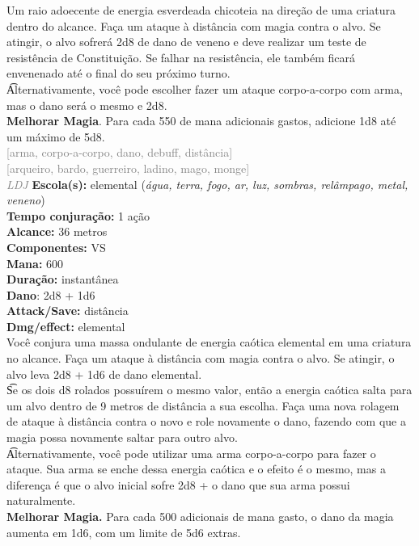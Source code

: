\documentclass{RPG_Adventure}[2021/10/20]
\begin{document}
{\normalsize Um raio adoecente de energia esverdeada chicoteia na direção de uma criatura dentro do alcance. Faça um ataque à distância com magia contra o alvo. Se atingir, o alvo sofrerá 2d8 de dano de veneno e deve realizar um teste de resistência de Constituição. Se falhar na resistência, ele também ficará envenenado até o final do seu próximo turno.\\\t Alternativamente, você pode escolher fazer um ataque corpo-a-corpo com arma, mas o dano será o mesmo e 2d8.\\\t \textbf{Melhorar Magia}. Para cada 550 de mana adicionais gastos, adicione 1d8 até um máximo de 5d8.\\}
{\scriptsize \textcolor{gray}{[arma, corpo-a-corpo, dano, debuff, distância]\\}}
{\scriptsize \textcolor{gray}{[arqueiro, bardo, guerreiro, ladino, mago, monge]\\}}
{\tiny \textcolor{gray}{\textit{LDJ}}}\jump{}
{\small \t \textbf{Escola(s):} elemental (\textit{água, terra, fogo, ar, luz, sombras, relâmpago, metal, veneno})\\\t \textbf{Tempo conjuração:} 1 ação\\\t \textbf{Alcance:} 36 metros\\\t \textbf{Componentes:} VS\\\t \textbf{Mana:} 600\\\t \textbf{Duração:} instantânea\\\t \textbf{Dano}: 2d8 + 1d6\\\t \textbf{Attack/Save:} distância\\\t \textbf{Dmg/effect:} elemental\\}
{\normalsize Você conjura uma massa ondulante de energia caótica elemental em uma criatura no alcance. Faça um ataque à distância com magia contra o alvo. Se atingir, o alvo leva 2d8 + 1d6 de dano elemental.\\\t Se os dois d8 rolados possuírem o mesmo valor, então a energia caótica salta para um alvo dentro de 9 metros de distância a sua escolha. Faça uma nova rolagem de ataque à distância contra o novo e role novamente o dano, fazendo com que a magia possa novamente saltar para outro alvo.\\\t Alternativamente, você pode utilizar uma arma corpo-a-corpo para fazer o ataque. Sua arma se enche dessa energia caótica e o efeito é o mesmo, mas a diferença é que o alvo inicial sofre 2d8 + o dano que sua arma possui naturalmente.\\\t \textbf{Melhorar Magia.} Para cada 500 adicionais de mana gasto, o dano da magia aumenta em 1d6, com um limite de 5d6 extras.\\}
\end{document}
